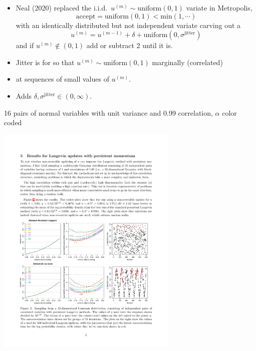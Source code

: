 \documentclass[10pt]{report}
\newcommand{\draw}[2]{#1^{(#2)}}
\begin{document}
\begin{itemize}
\item Neal (2020) replaced the i.i.d.\ $\draw{u}{m} \sim \textrm{uniform}(0, 1)$
  variate in Metropolis,
  $$
  \textrm{accept} = \textrm{uniform}(0, 1)
  < \textrm{min}(1, \cdots)
  $$
  with an identically distributed but not independent variate carving out a
  $$
  \draw{u}{m} = \draw{u}{m-1} + \delta + \textrm{uniform}(0,
  \sigma^{\textrm{jitter}})
  $$
  and if $\draw{u}{m} \not\in (0, 1)$ add or subtract 2 until it is.
\item Jitter is for  so that $\draw{u}{m} \sim
  \textrm{uniform}(0, 1)$ marginally (correlated)
\item {} at sequences of small values of $\draw{u}{m}$.
\item Adds  $\delta,
  \sigma^{\textrm{jitter}} \in (0, \infty)$.
\end{itemize}

\begin{subitemize}
  \vspace*{-3pt}
  \item 16 pairs of normal variables with unit variance and 0.99
    correlation, $\alpha$ color coded
  \end{subitemize}
\begin{center}
  \vspace*{-3pt}
  \includegraphics[width=0.65\textwidth]{img/neal-nonrevu.pdf}
\end{center}
\end{document}
